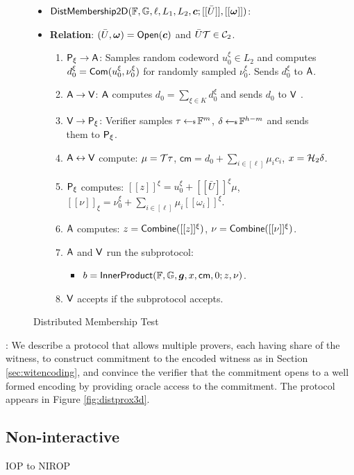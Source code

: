 \begin{figure}[h!]
\centering
\begin{framed}
\begin{itemize}
\item $\mathsf{DistMembership2D}(\mathbb{F},\mathbb{G},\ell,L_1,L_2,\bm{c};[[\bar{U}]],[[\bm{\omega}]])$:
\item {\bf Relation}: $(\bar{U},\bm{\omega})=\mathsf{Open}(\bm{c})$ and
$\bar{U}\mathcal{T}\in \mathcal{C}_2$.
\begin{enumerate}[{\rm 1.}]
\item $\mathsf{P}_\xi\rightarrow \mathsf{A}$: Samples random codeword $u^\xi_0\in L_2$ and
computes $d^\xi_0=\mathsf{Com}(u^\xi_0,\nu^\xi_0)$ for randomly sampled $\nu^\xi_0$.
Sends $d^\xi_0$ to $\mathsf{A}$.
\item {\color{red} $\mathsf{A}\rightarrow \mathsf{V}$: $\mathsf{A}$ computes $d_0=\sum_{\xi\in
K}d^\xi_0$ and sends $d_0$ to $\mathsf{V}$ }.
\item $\mathsf{V}\rightarrow \mathsf{P}_\xi$: Verifier samples $\tau\hskip2.3pt{\gets\!\!\mbox{\tiny${\$}$\normalsize}}\, \mathbb{F}^m$,
$\delta\hskip2.3pt{\gets\!\!\mbox{\tiny${\$}$\normalsize}}\, \mathbb{F}^{h-m}$ and sends them to $\mathsf{P}_\xi$.
\item $\mathsf{A}\leftrightarrow \mathsf{V}$ compute: $\mu=\mathcal{T}\tau$,
$\mathsf{cm}=d_0+\sum_{i\in [\ell]}\mu_ic_i$, $x=\mathcal{H}_2\delta$.
\item $\mathsf{P}_\xi$ computes: $[[z]]^\xi=u^\xi_0+[[\bar{U}]]^\xi\mu$,
$[[\nu]]_\xi=\nu^\xi_0+\sum_{i\in [\ell]}\mu_i[[\omega_i]]^\xi$.
\item {\color{red} $\mathsf{A}$ computes: $z=\mathsf{Combine}([[z]]^\xi)$,
$\nu=\mathsf{Combine}([[\nu]]^\xi)$}.
\item $\mathsf{A}$ and $\mathsf{V}$ run the subprotocol:
	\begin{itemize}
	\item $b=\mathsf{InnerProduct}(\mathbb{F},\mathbb{G},\bm{g},x,\mathsf{cm},0;z,\nu)$.
	\end{itemize}
\item $\mathsf{V}$ accepts if the subprotocol accepts.
\end{enumerate}
\end{itemize}
\end{framed}
\caption{Distributed Membership Test}
\label{fig:distprox2d}
\end{figure}

: We describe a protocol that allows
multiple provers, each having share of the witness, to construct commitment to
the encoded witness as in Section \ref{sec:witencoding}, and convince the
verifier that the commitment opens to a well formed encoding by providing oracle
access to the commitment. The protocol appears in Figure \ref{fig:distprox3d}.


   



\subsection{Non-interactive}
IOP to NIROP
